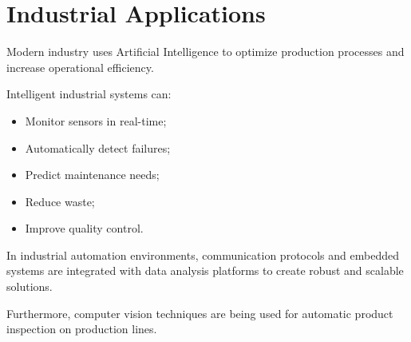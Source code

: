 \section{Industrial Applications}

Modern industry uses Artificial Intelligence to optimize production processes and increase
operational efficiency.

Intelligent industrial systems can:

\begin{itemize}
    \item Monitor sensors in real-time;
    \item Automatically detect failures;
    \item Predict maintenance needs;
    \item Reduce waste;
    \item Improve quality control.
\end{itemize}

In industrial automation environments, communication protocols and embedded systems are
integrated with data analysis platforms to create robust and scalable solutions.
 
Furthermore, computer vision techniques are being used for automatic product inspection
on production lines.